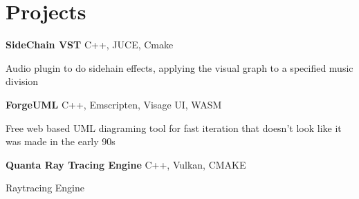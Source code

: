 
\newenvironment{twocolentry_proj}[2][]{
    \onecolentry
    \def\secondColumn{#2}
    \setcolumnwidth{\fill, 7 cm}
    \begin{paracol}{2}
}{
    \switchcolumn \raggedleft \secondColumn
    \end{paracol}
    \endonecolentry
} %

\vspace{5 pt - 0.5 cm}
\section{Projects}
\begin{twocolentry_proj}{
    \mbox{}%
}
\fontsize{11 pt}{11 pt}\textbf{SideChain VST} C++, JUCE, Cmake
\end{twocolentry_proj}

\begin{onecolentry}
    \begin{highlights}
        \item Audio plugin to do sidehain effects, applying the visual graph to a specified music division
    \end{highlights}
\end{onecolentry}

\vspace{0.10 cm}
\begin{twocolentry_proj}{
    \mbox{}%
}
\fontsize{11 pt}{11 pt}\textbf{ForgeUML} C++, Emscripten, Visage UI, WASM
\end{twocolentry_proj}
\begin{onecolentry}
    \begin{highlights}
        \item Free web based UML diagraming tool for fast iteration that doesn't look like it was made in the early 90s
    \end{highlights}
\end{onecolentry}

\vspace{0.10 cm}
\begin{twocolentry_proj}{
    \mbox{}%
}
\fontsize{11 pt}{11 pt}\textbf{Quanta Ray Tracing Engine} C++, Vulkan, CMAKE
\end{twocolentry_proj}
\begin{onecolentry}
    \begin{highlights}
        \item Raytracing Engine
    \end{highlights}
\end{onecolentry}

\vspace{0.2 cm}
